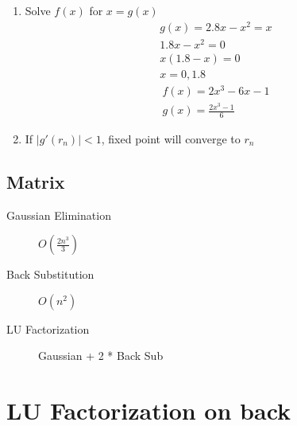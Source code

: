\documentclass[10pt]{article}
\begin{document}
\begin{multicols}{2}
\begin{minipage}{\columnwidth}
\begin{flushright}
\begin{enumerate}
                \item Solve \(f(x)\) for \(x = g(x)\) \\
                    \begin{align*}
                        g(x) = 2.8x - x^2 = x \\
                        1.8x -x^2 = 0 \\
                        x(1.8 - x) = 0 \\
                        x = 0, 1.8
                    \end{align*}
                    \begin{align*}
                        f(x) = 2x^3 - 6x - 1 \\
                        g(x) = \frac{2x^3-1}{6}
                    \end{align*}
                \item If \(|g'(r_n)| < 1\), fixed point will converge to \(r_n\)
            \end{enumerate}
        \end{flushright}
    \end{minipage}
\end{multicols}

\begin{multicols}{2}
    \begin{minipage}{\columnwidth}
        \subsection*{Matrix}
        \begin{description}
            \item[Gaussian Elimination] \(O(\frac{2n^3}{3})\)
            \item[Back Substitution] \(O(n^2)\)
            \item[LU Factorization] Gaussian + 2 * Back Sub
        \end{description}
    \end{minipage}
    \begin{minipage}{\columnwidth}
        \section*{LU Factorization on back}
    \end{minipage}
\end{multicols}
\end{document}
